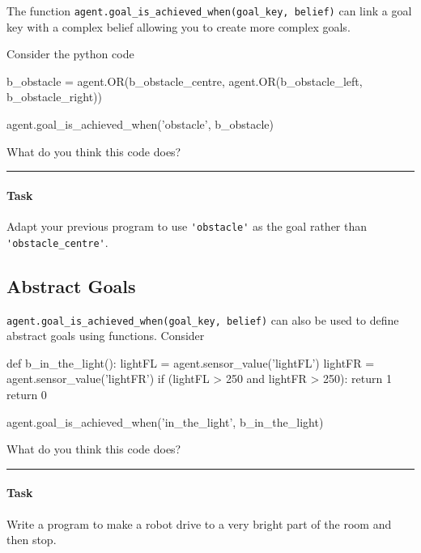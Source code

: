 \documentclass[a4,12pt]{article}
\begin{document}
The function \lstinline{agent.goal_is_achieved_when(goal_key, belief)} can link a goal key with a complex belief allowing you to create more complex goals.

Consider the python code

\noindent \begin{pythonlisting}
b_obstacle = agent.OR(b_obstacle_centre, agent.OR(b_obstacle_left, b_obstacle_right))

agent.goal_is_achieved_when('obstacle', b_obstacle)
\end{pythonlisting}

\vspace{1cm}
\noindent What do you think this code does? \underline{\hspace{10cm}}
\vspace{1cm}
\hrule
\medskip

\paragraph{Task}  Adapt your previous program to use \lstinline{'obstacle'} as the goal rather than \lstinline{'obstacle_centre'}.

\subsection{Abstract Goals}

\lstinline{agent.goal_is_achieved_when(goal_key, belief)} can also be used to define abstract goals using functions.   Consider

\noindent \begin{pythonlisting}
def b_in_the_light():
	lightFL = agent.sensor_value('lightFL')
	lightFR = agent.sensor_value('lightFR')
	if (lightFL > 250 and lightFR > 250):
		return 1
	return 0

agent.goal_is_achieved_when('in_the_light', b_in_the_light)
\end{pythonlisting}

\vspace{1cm}
\noindent What do you think this code does? \underline{\hspace{10cm}}
\vspace{1cm}
\hrule
\medskip

\paragraph{Task} Write a program to make a robot drive to a very bright part of the room and then stop.
\end{document}
